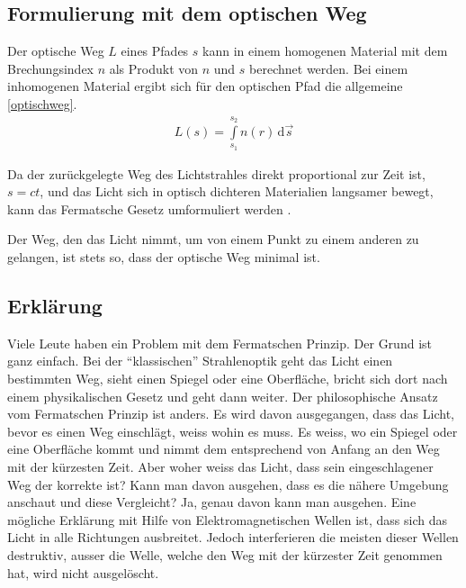 \subsection{Formulierung mit dem optischen Weg}
Der optische Weg $L$  eines Pfades $s$ kann in einem homogenen Material 
mit dem Brechungsindex $n$ als Produkt von $n$ und $s$ berechnet werden.
Bei einem inhomogenen Material ergibt sich für den optischen Pfad die allgemeine \eqref{optischweg}.
\begin{align}
	L(s) = \int\limits_{s_1}^{s_2} n(r) \,\mathrm d\vec s 
	\label{optischweg}
\end{align}

Da der zurückgelegte Weg des Lichtstrahles direkt proportional zur Zeit ist, $s = c t$,
und das Licht sich in optisch dichteren Materialien langsamer bewegt,
kann das Fermatsche Gesetz umformuliert werden \cite{DefinitionFermat}. 

\begin{postulat}
Der Weg, den das Licht nimmt, um von einem Punkt zu einem anderen zu gelangen, ist stets so, dass der optische Weg minimal ist.
\end{postulat}

\subsection{Erklärung}
Viele Leute haben ein Problem mit dem Fermatschen Prinzip. 
Der Grund ist ganz einfach. 
Bei der ``klassischen'' Strahlenoptik geht das Licht einen bestimmten Weg, 
sieht einen Spiegel oder eine Oberfläche, bricht sich dort nach einem 
physikalischen Gesetz und geht dann weiter.
Der philosophische Ansatz vom Fermatschen Prinzip ist anders. 
Es wird davon ausgegangen, dass das Licht, bevor es einen Weg einschlägt, 
weiss wohin es muss. Es weiss, wo ein Spiegel oder eine Oberfläche kommt und 
nimmt dem entsprechend von Anfang an den Weg mit der kürzesten Zeit.
Aber woher weiss das Licht, dass sein eingeschlagener Weg der korrekte ist?
Kann man davon ausgehen, dass es die nähere Umgebung anschaut und diese Vergleicht?
Ja, genau davon kann man ausgehen. Eine mögliche Erklärung mit Hilfe von Elektromagnetischen Wellen ist,
dass sich das Licht in alle Richtungen ausbreitet. 
Jedoch interferieren die meisten dieser Wellen destruktiv, 
ausser die Welle, welche den Weg mit der kürzester Zeit genommen hat, wird nicht ausgelöscht.
